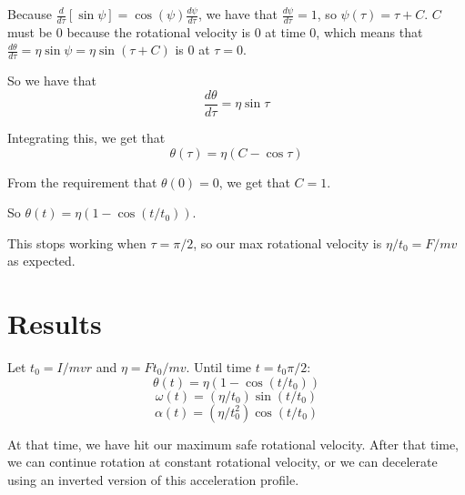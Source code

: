 \documentclass[12pt]{article}
\begin{document}
Because $\frac{d}{d \tau}[\sin \psi] = \cos (\psi) \frac{d \psi}{d \tau}$, we have that $\frac{d \psi}{d \tau} = 1$, so $\psi(\tau) = \tau + C$. $C$ must be 0 because the rotational velocity is 0 at time 0, which means that $\frac{d \theta}{d \tau} = \eta \sin \psi = \eta \sin (\tau + C)$ is 0 at $\tau = 0$.

So we have that
$$ \frac{d \theta}{d \tau} = \eta \sin \tau $$

Integrating this, we get that
$$ \theta(\tau) = \eta (C - \cos \tau) $$

From the requirement that $\theta(0) = 0$, we get that $C = 1$.

So $\theta(t) = \eta (1 - \cos (t/t_0))$.

This stops working when $\tau = \pi/2$, so our max rotational velocity is $\eta / t_0 = F/m v$ as expected.

\section{Results}

Let $ t_0 = I / m v r $ and $ \eta = F t_0 / m v $.
Until time $t = t_0 \pi / 2$:
$$ \theta(t) = \eta (1 - \cos (t / t_0)) $$
$$ \omega(t) = (\eta / t_0) \sin (t / t_0) $$
$$ \alpha(t) = (\eta / t_0^2) \cos (t / t_0) $$

At that time, we have hit our maximum safe rotational velocity.  After that time, we can continue rotation at constant rotational velocity, or we can decelerate using an inverted version of this acceleration profile.
\end{document}
